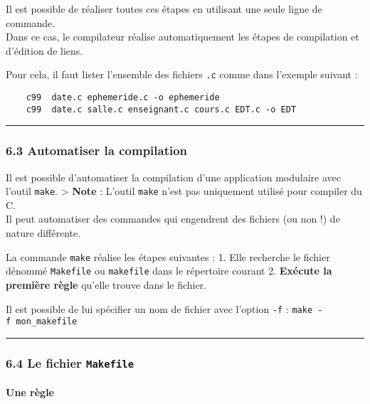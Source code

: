 \documentclass[11pt]{article}
\begin{document}
Il est possible de réaliser toutes ces étapes en utilisant une seule
ligne de commande.\\
Dans ce cas, le compilateur réalise automatiquement les étapes de
compilation et d'édition de liens.

Pour cela, il faut lister l'ensemble des fichiers \texttt{.c} comme dans
l'exemple suivant :

\begin{verbatim}
    c99  date.c ephemeride.c -o ephemeride
    c99  date.c salle.c enseignant.c cours.c EDT.c -o EDT     
\end{verbatim}

    \begin{center}\rule{0.5\linewidth}{\linethickness}\end{center}

    \subsubsection{6.3 Automatiser la
compilation}\label{automatiser-la-compilation}

Il est possible d'automatiser la compilation d'une application modulaire
avec l'outil \texttt{make}. \textgreater{} \textbf{Note} : L'outil
\texttt{make} n'est pas uniquement utilisé pour compiler du C.\\
Il peut automatiser des commandes qui engendrent des fichiers (ou non !)
de nature différente.

La commande \texttt{make} réalise les étapes suivantes : 1. Elle
recherche le fichier dénommé \texttt{Makefile} ou \texttt{makefile} dans
le répertoire courant 2. \textbf{Exécute la première règle} qu'elle
trouve dans le fichier.

Il est possible de lui spécifier un nom de fichier avec l'option
\texttt{-f} : \texttt{make\ -f\ mon\_makefile}

    \begin{center}\rule{0.5\linewidth}{\linethickness}\end{center}

    \subsubsection{\texorpdfstring{6.4 Le fichier
\texttt{Makefile}}{6.4 Le fichier Makefile}}\label{le-fichier-makefile}

\paragraph{Une règle}\label{une-ruxe8gle}
\end{document}

